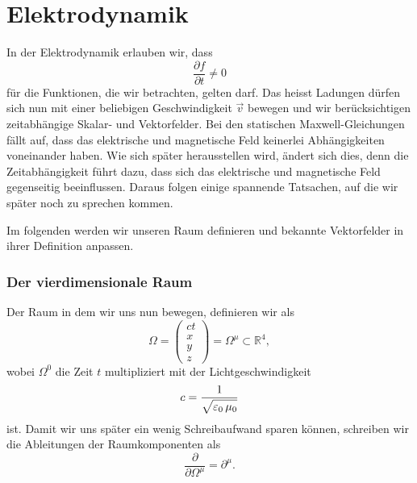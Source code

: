 %
%
%
%
\tikzset{>=latex} %

\section{Elektrodynamik\label{section:maxwell:elektrodynmaik}}
In der Elektrodynamik erlauben wir, dass
\[
\frac{\partial f}{\partial t}
\neq
0
\]
für die Funktionen, die wir betrachten, gelten darf.
Das heisst Ladungen dürfen sich nun mit einer beliebigen Geschwindigkeit $\vec{v}$ bewegen und wir berücksichtigen zeitabhängige Skalar- und Vektorfelder.
Bei den statischen Maxwell-Gleichungen fällt auf, dass das elektrische und magnetische Feld keinerlei Abhängigkeiten voneinander haben.
Wie sich später herausstellen wird, ändert sich dies, denn die Zeitabhängigkeit führt dazu, dass sich das elektrische und magnetische Feld gegenseitig beeinflussen.
Daraus folgen einige spannende Tatsachen, auf die wir später noch zu sprechen kommen.
 
Im folgenden werden wir unseren Raum definieren und bekannte Vektorfelder in ihrer Definition anpassen.

\subsubsection{Der vierdimensionale Raum}
Der Raum in dem wir uns nun bewegen, definieren wir als
\begin{equation}
	\Omega
	=
	\begin{pmatrix}
		ct\\
		x\\
		y\\
		z
	\end{pmatrix}
	=
	\Omega^{\mu} \subset \mathbb{R}^4,
\end{equation}
wobei $\Omega^0$ die Zeit $t$ multipliziert mit der Lichtgeschwindigkeit
\[
c
=
\frac{1}{\sqrt{\varepsilon_0\,\mu_0\mathstrut}}
\]
ist.
Damit wir uns später ein wenig Schreibaufwand sparen können, schreiben wir die Ableitungen der Raumkomponenten als
\[
\frac{\partial}{\partial \Omega^{\mu}}
=
\partial^{\mu}.
\]

